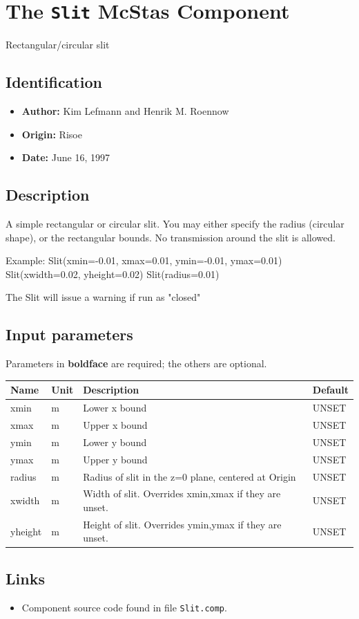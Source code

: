\section{The \texttt{Slit} McStas Component}
Rectangular/circular slit

\subsection*{Identification}
\begin{itemize}
  \item \textbf{Author:} Kim Lefmann and Henrik M. Roennow
  \item \textbf{Origin:} Risoe
  \item \textbf{Date:} June 16, 1997
\end{itemize}

\subsection*{Description}
A simple rectangular or circular slit. You may either specify the radius (circular shape), or the rectangular bounds. No transmission around the slit is allowed.

Example: Slit(xmin=-0.01, xmax=0.01, ymin=-0.01, ymax=0.01) Slit(xwidth=0.02, yheight=0.02) Slit(radius=0.01)

The Slit will issue a warning if run as "closed"

\subsection*{Input parameters}
Parameters in \textbf{boldface} are required; the others are optional.

\begin{longtable}{p{}p{}p{}p{}}
\toprule
\textbf{Name} & \textbf{Unit} & \textbf{Description} & \textbf{Default} \\
\midrule
\endhead
xmin & m & Lower x bound & UNSET \\
xmax & m & Upper x bound & UNSET \\
ymin & m & Lower y bound & UNSET \\
ymax & m & Upper y bound & UNSET \\
radius & m & Radius of slit in the z=0 plane, centered at Origin & UNSET \\
xwidth & m & Width of slit. Overrides xmin,xmax if they are unset. & UNSET \\
yheight & m & Height of slit. Overrides ymin,ymax if they are unset. & UNSET \\
\bottomrule
\end{longtable}

\subsection*{Links}
\begin{itemize}
  \item Component source code found in file \texttt{Slit.comp}.
\end{itemize}
